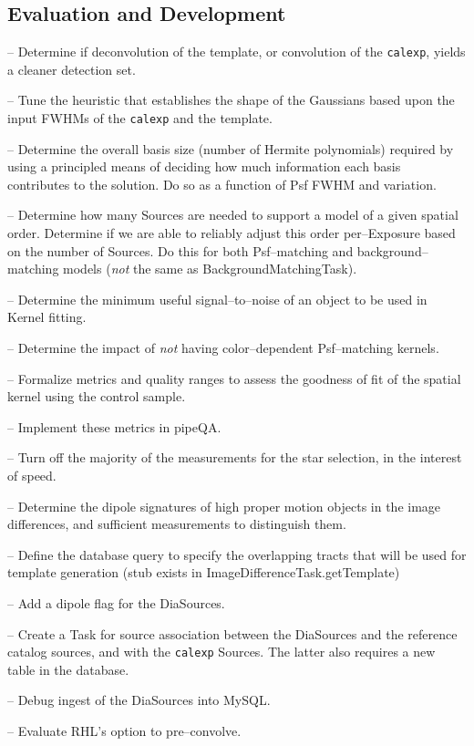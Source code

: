 \documentclass[12pt]{article}
\begin{document}
\subsection{Evaluation and Development}

-- Determine if deconvolution of the template, or convolution of the {\tt calexp},
yields a cleaner detection set.

-- Tune the heuristic that establishes the shape of the Gaussians based upon
the input FWHMs of the {\tt calexp} and the template.

-- Determine the overall basis size (number of Hermite polynomials) 
required by using a principled means of deciding how much information each basis contributes to the solution.  
Do so as a function of Psf FWHM and variation.

-- Determine how many Sources are needed to support a model of a given spatial order.   Determine
if we are able to reliably adjust this order per--Exposure based on the number of Sources.  Do this
for both Psf--matching and background--matching models ({\it not} the same as BackgroundMatchingTask).


-- Determine the minimum useful signal--to--noise of an object to be
used in Kernel fitting.

-- Determine the impact of {\it not} having color--dependent Psf--matching kernels.

-- Formalize metrics and quality ranges to assess the goodness of fit
of the spatial kernel using the control sample.

-- Implement these metrics in pipeQA.

-- Turn off the majority of the measurements for the star
selection, in the interest of speed.

-- Determine the dipole signatures of high proper motion objects in the image differences,
and sufficient measurements to distinguish them.

-- Define the database query to specify the overlapping tracts that
will be used for template generation (stub exists in
ImageDifferenceTask.getTemplate)

-- Add a dipole flag for the DiaSources.

-- Create a Task for source association between the DiaSources and the
reference catalog sources, and with the {\tt calexp} Sources.  The
latter also requires a new table in the database.

-- Debug ingest of the DiaSources into MySQL.

-- Evaluate RHL's option to pre--convolve.
\end{document}
